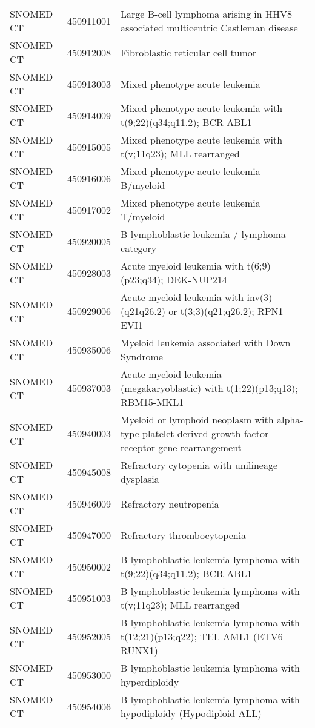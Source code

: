 \begin{longtable}{p{}p{}p{}}
  SNOMED CT & 450911001 & Large B-cell lymphoma arising in HHV8 associated multicentric Castleman disease \\ 
  SNOMED CT & 450912008 & Fibroblastic reticular cell tumor \\ 
  SNOMED CT & 450913003 & Mixed phenotype acute leukemia \\ 
  SNOMED CT & 450914009 & Mixed phenotype acute leukemia with t(9;22)(q34;q11.2); BCR-ABL1 \\ 
  SNOMED CT & 450915005 & Mixed phenotype acute leukemia with t(v;11q23); MLL rearranged \\ 
  SNOMED CT & 450916006 & Mixed phenotype acute leukemia B/myeloid \\ 
  SNOMED CT & 450917002 & Mixed phenotype acute leukemia T/myeloid \\ 
  SNOMED CT & 450920005 & B lymphoblastic leukemia / lymphoma - category \\ 
  SNOMED CT & 450928003 & Acute myeloid leukemia with t(6;9)(p23;q34); DEK-NUP214 \\ 
  SNOMED CT & 450929006 & Acute myeloid leukemia with inv(3)(q21q26.2) or t(3;3)(q21;q26.2); RPN1-EVI1 \\ 
  SNOMED CT & 450935006 & Myeloid leukemia associated with Down Syndrome \\ 
  SNOMED CT & 450937003 & Acute myeloid leukemia (megakaryoblastic) with t(1;22)(p13;q13); RBM15-MKL1 \\ 
  SNOMED CT & 450940003 & Myeloid or lymphoid neoplasm with alpha-type platelet-derived growth factor receptor gene rearrangement \\ 
  SNOMED CT & 450945008 & Refractory cytopenia with unilineage dysplasia \\ 
  SNOMED CT & 450946009 & Refractory neutropenia \\ 
  SNOMED CT & 450947000 & Refractory thrombocytopenia \\ 
  SNOMED CT & 450950002 & B lymphoblastic leukemia lymphoma with t(9;22)(q34;q11.2); BCR-ABL1 \\ 
  SNOMED CT & 450951003 & B lymphoblastic leukemia lymphoma with t(v;11q23); MLL rearranged \\ 
  SNOMED CT & 450952005 & B lymphoblastic leukemia lymphoma with t(12;21)(p13;q22); TEL-AML1 (ETV6-RUNX1) \\ 
  SNOMED CT & 450953000 & B lymphoblastic leukemia lymphoma with hyperdiploidy \\ 
  SNOMED CT & 450954006 & B lymphoblastic leukemia lymphoma with hypodiploidy (Hypodiploid ALL) \\ 

\end{longtable}
